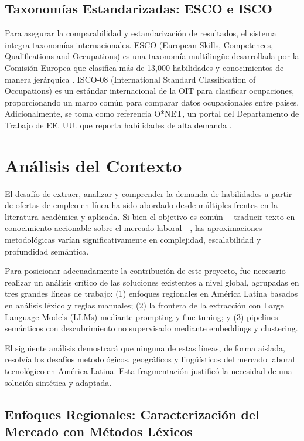 \subsection{Taxonomías Estandarizadas: ESCO e ISCO}

Para asegurar la comparabilidad y estandarización de resultados, el sistema integra taxonomías internacionales. ESCO (European Skills, Competences, Qualifications and Occupations) es una taxonomía multilingüe desarrollada por la Comisión Europea que clasifica más de 13,000 habilidades y conocimientos de manera jerárquica \cite{kavargyris2025}. ISCO-08 (International Standard Classification of Occupations) es un estándar internacional de la OIT para clasificar ocupaciones, proporcionando un marco común para comparar datos ocupacionales entre países. Adicionalmente, se toma como referencia O*NET, un portal del Departamento de Trabajo de EE. UU. que reporta habilidades de alta demanda \cite{rubio2025}.

\section{Análisis del Contexto}

El desafío de extraer, analizar y comprender la demanda de habilidades a partir de ofertas de empleo en línea ha sido abordado desde múltiples frentes en la literatura académica y aplicada. Si bien el objetivo es común ---traducir texto en conocimiento accionable sobre el mercado laboral---, las aproximaciones metodológicas varían significativamente en complejidad, escalabilidad y profundidad semántica.

Para posicionar adecuadamente la contribución de este proyecto, fue necesario realizar un análisis crítico de las soluciones existentes a nivel global, agrupadas en tres grandes líneas de trabajo: (1) enfoques regionales en América Latina basados en análisis léxico y reglas manuales; (2) la frontera de la extracción con Large Language Models (LLMs) mediante prompting y fine-tuning; y (3) pipelines semánticos con descubrimiento no supervisado mediante embeddings y clustering.

El siguiente análisis demostrará que ninguna de estas líneas, de forma aislada, resolvía los desafíos metodológicos, geográficos y lingüísticos del mercado laboral tecnológico en América Latina. Esta fragmentación justificó la necesidad de una solución sintética y adaptada.

\subsection{Enfoques Regionales: Caracterización del Mercado con Métodos Léxicos}

